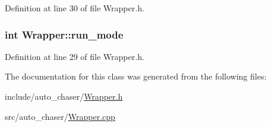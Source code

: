 Definition at line 30 of file Wrapper.\+h.

\subsubsection[{\texorpdfstring{run\+\_\+mode}{run_mode}}]{\setlength{\rightskip}{0pt plus 5cm}int Wrapper\+::run\+\_\+mode}\hypertarget{class_wrapper_a4b4e8407edf38f99eb9d5a0cd4a0116b}{}\label{class_wrapper_a4b4e8407edf38f99eb9d5a0cd4a0116b}


Definition at line 29 of file Wrapper.\+h.



The documentation for this class was generated from the following files\+:\begin{DoxyCompactItemize}
\item 
include/auto\+\_\+chaser/\hyperlink{_wrapper_8h}{Wrapper.\+h}\item 
src/auto\+\_\+chaser/\hyperlink{_wrapper_8cpp}{Wrapper.\+cpp}\end{DoxyCompactItemize}
